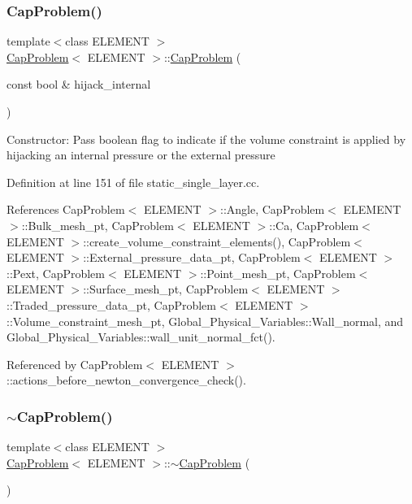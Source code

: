 \subsubsection{\texorpdfstring{Cap\+Problem()}{CapProblem()}\hspace{0.1cm}{\footnotesize\ttfamily [1/2]}}
{\footnotesize\ttfamily template$<$class E\+L\+E\+M\+E\+NT $>$ \\
\hyperlink{classCapProblem}{Cap\+Problem}$<$ E\+L\+E\+M\+E\+NT $>$\+::\hyperlink{classCapProblem}{Cap\+Problem} (\begin{DoxyParamCaption}\item[{const bool \&}]{hijack\+\_\+internal }\end{DoxyParamCaption})}

Constructor\+: Pass boolean flag to indicate if the volume constraint is applied by hijacking an internal pressure or the external pressure 

Definition at line 151 of file static\+\_\+single\+\_\+layer.\+cc.



References Cap\+Problem$<$ E\+L\+E\+M\+E\+N\+T $>$\+::\+Angle, Cap\+Problem$<$ E\+L\+E\+M\+E\+N\+T $>$\+::\+Bulk\+\_\+mesh\+\_\+pt, Cap\+Problem$<$ E\+L\+E\+M\+E\+N\+T $>$\+::\+Ca, Cap\+Problem$<$ E\+L\+E\+M\+E\+N\+T $>$\+::create\+\_\+volume\+\_\+constraint\+\_\+elements(), Cap\+Problem$<$ E\+L\+E\+M\+E\+N\+T $>$\+::\+External\+\_\+pressure\+\_\+data\+\_\+pt, Cap\+Problem$<$ E\+L\+E\+M\+E\+N\+T $>$\+::\+Pext, Cap\+Problem$<$ E\+L\+E\+M\+E\+N\+T $>$\+::\+Point\+\_\+mesh\+\_\+pt, Cap\+Problem$<$ E\+L\+E\+M\+E\+N\+T $>$\+::\+Surface\+\_\+mesh\+\_\+pt, Cap\+Problem$<$ E\+L\+E\+M\+E\+N\+T $>$\+::\+Traded\+\_\+pressure\+\_\+data\+\_\+pt, Cap\+Problem$<$ E\+L\+E\+M\+E\+N\+T $>$\+::\+Volume\+\_\+constraint\+\_\+mesh\+\_\+pt, Global\+\_\+\+Physical\+\_\+\+Variables\+::\+Wall\+\_\+normal, and Global\+\_\+\+Physical\+\_\+\+Variables\+::wall\+\_\+unit\+\_\+normal\+\_\+fct().



Referenced by Cap\+Problem$<$ E\+L\+E\+M\+E\+N\+T $>$\+::actions\+\_\+before\+\_\+newton\+\_\+convergence\+\_\+check().

\mbox{\label{classCapProblem_ad2b434212ecb33467359aef1071bc964}} 
\subsubsection{\texorpdfstring{$\sim$\+Cap\+Problem()}{~CapProblem()}}
{\footnotesize\ttfamily template$<$class E\+L\+E\+M\+E\+NT $>$ \\
\hyperlink{classCapProblem}{Cap\+Problem}$<$ E\+L\+E\+M\+E\+NT $>$\+::$\sim$\hyperlink{classCapProblem}{Cap\+Problem} (\begin{DoxyParamCaption}{ }\end{DoxyParamCaption})}

